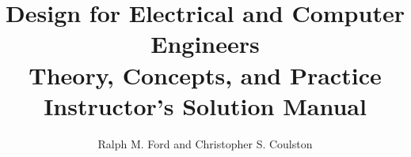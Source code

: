 \documentclass[letterpaper, 10pt]{memoir}
\begin{document}
\frontmatter
\title{{\Huge Design for Electrical and Computer Engineers} \\
				Theory, Concepts, and Practice\\
				Instructor's Solution Manual}
\author{Ralph M. Ford and Christopher S. Coulston}
\date{}
\maketitle

\tableofcontents

\mainmatter 					%

\showanswers


\end{document}
